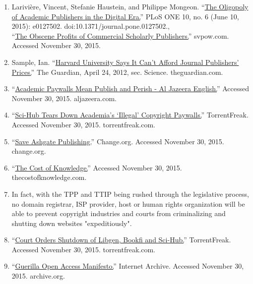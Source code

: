 \documentclass[11pt,a4paper]{article}
\begin{document}
\begin{enumerate}
\item
  \protect\hypertarget{fn-1}{}{Larivière, Vincent, Stefanie Haustein,
  and Philippe Mongeon.
  ``\href{http://journals.plos.org/plosone/article?id=10.1371/journal.pone.0127502}{The
  Oligopoly of Academic Publishers in the Digital Era.}'' PLoS ONE 10,
  no. 6 (June 10, 2015): e0127502. doi:10.1371/journal.pone.0127502.,\\
  ``\href{http://svpow.com/2012/01/13/the-obscene-profits-of-commercial-scholarly-publishers/}{The
  Obscene Profits of Commercial Scholarly Publishers.}'' svpow.com.
  Accessed November 30, 2015. ~\protect\hyperlink{fnref-1}{}}
\item
  \protect\hypertarget{fn-2}{}{Sample, Ian.
  ``\href{http://www.theguardian.com/science/2012/apr/24/harvard-university-journal-publishers-prices}{Harvard
  University Says It Can't Afford Journal Publishers' Prices.}'' The
  Guardian, April 24, 2012, sec. Science. theguardian.com.
  ~\protect\hyperlink{fnref-2}{}}
\item
  \protect\hypertarget{fn-3}{}{``\href{http://www.aljazeera.com/indepth/opinion/2012/10/20121017558785551.html}{Academic
  Paywalls Mean Publish and Perish - Al Jazeera English.}'' Accessed
  November 30, 2015. aljazeera.com. ~\protect\hyperlink{fnref-3}{}}
\item
  \protect\hypertarget{fn-4}{}{``\href{https://torrentfreak.com/sci-hub-tears-down-academias-illegal-copyright-paywalls-150627/}{Sci-Hub
  Tears Down Academia's `Illegal' Copyright Paywalls.}'' TorrentFreak.
  Accessed November 30, 2015. torrentfreak.com.
  ~\protect\hyperlink{fnref-4}{}}
\item
  \protect\hypertarget{fn-5}{}{``\href{https://www.change.org/p/save-ashgate-publishing}{Save
  Ashgate Publishing.}'' Change.org. Accessed November 30, 2015.
  change.org. ~\protect\hyperlink{fnref-5}{}}
\item
  \protect\hypertarget{fn-6}{}{``\href{http://thecostofknowledge.com/}{The
  Cost of Knowledge.}'' Accessed November 30, 2015.
  thecostofknowledge.com. ~\protect\hyperlink{fnref-6}{}}
\item
  \protect\hypertarget{fn-7}{}{{In fact, with the TPP and TTIP being
  rushed through the legislative process, no domain registrar, ISP
  provider, host or human rights organization will be able to prevent
  copyright industries and courts from criminalizing and shutting down
  websites "expeditiously". ~\protect\hyperlink{fnref-7}{}}}
\item
  \protect\hypertarget{fn-8}{}{``\href{https://torrentfreak.com/court-orders-shutdown-of-libgen-bookfi-and-sci-hub-151102/}{Court
  Orders Shutdown of Libgen, Bookfi and Sci-Hub.}'' TorrentFreak.
  Accessed November 30, 2015. torrentfreak.com.
  ~\protect\hyperlink{fnref-8}{}}
\item
  \protect\hypertarget{fn-9}{}{``\href{https://archive.org/stream/GuerillaOpenAccessManifesto/Goamjuly2008_djvu.txt}{Guerilla
  Open Access Manifesto.}'' Internet Archive. Accessed November 30,
  2015. archive.org. ~\protect\hyperlink{fnref-9}{}}
\end{enumerate}
\end{document}
